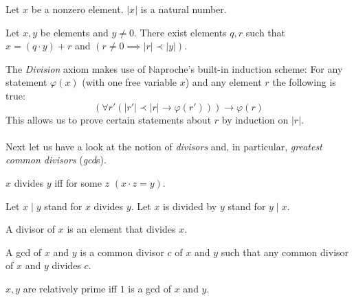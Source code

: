 \documentclass{article}
\begin{document}
  \begin{forthel}
    \begin{signature}[id=EucSort]
      Let $x$ be a nonzero element. $|x|$ is a natural number.
    \end{signature}

    \begin{axiom}[id=Division]
      Let $x,y$ be elements and $y \neq 0$.
      There exist elements $q,r$ such that $x = (q \cdot y) + r$ and
      $(r \neq 0 \implies |r| \prec |y|)$.
    \end{axiom}
  \end{forthel}

  The \textit{Division} axiom makes use of {$\mathbb{N}$aproche's} built-in
  induction scheme: For any statement $\varphi(x)$ (with one free variable $x$)
  and any element $r$ the following is true:
  \[ (\forall r' (|r'| \prec |r| \rightarrow \varphi(r'))) \rightarrow \varphi(r) \]
  This allows us to prove certain statements about $r$ by induction on $|r|$.

  \paragraph{} Next let us have a look at the notion of \textit{divisors} and,
  in particular, \textit{greatest common divisors} (\textit{gcd}s).

  \begin{forthel}
    \begin{definition}[id=DefDiv]
      $x$ divides $y$ iff for some $z$ $(x \cdot z = y)$.
    \end{definition}

    Let $x \mid y$ stand for $x$ divides $y$.
    Let $x$ is divided by $y$ stand for $y \mid x$.

    \begin{definition}[id=DefDvs]
      A divisor of $x$ is an element that divides $x$.
    \end{definition}

    \begin{definition}[id=DefGCD]
      A gcd of $x$ and $y$ is a common divisor $c$ of $x$ and $y$ such that any
      common divisor of $x$ and $y$ divides $c$.
    \end{definition}

    \begin{definition}[id=DefRel]
      $x,y$ are relatively prime iff $1$ is a gcd of $x$ and $y$.
    \end{definition}
  \end{forthel}
\end{document}
